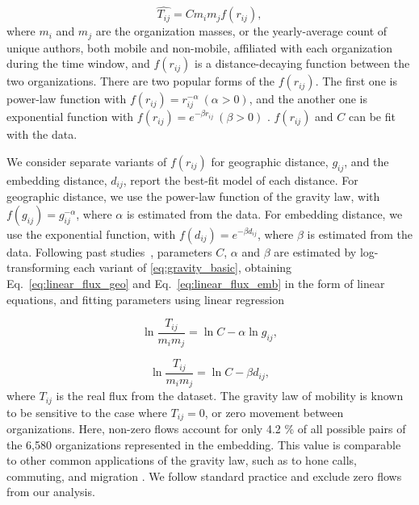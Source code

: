 \documentclass[12pt]{article} %
\begin{document}
%
%
\begin{equation}
	\label{eq:gravity_basic}
	\hat{T_{ij}} = Cm_{i}m_{j}f(r_{ij}),
\end{equation}
where $m_{i}$ and $m_{j}$ are the organization masses, or the yearly-average count of unique authors, both mobile and non-mobile, affiliated with each organization during the time window, and $f(r_{ij})$ is a distance-decaying function  between the two organizations. There are two popular forms of the $f(r_{ij})$. The first one is power-law function with $f(r_{ij})= r^{-\alpha}_{ij} \ (\alpha > 0)$, and the another one is exponential function with $f(r_{ij}) = e^{-\beta r_{ij}} \ (\beta > 0)$ \autocite{chen2015distance}.  
$f(r_{ij})$ and $C$ can be fit with the data.

We consider separate variants of $f(r_{ij})$ for geographic distance, $g_{ij}$, and the embedding distance, $d_{ij}$, report the best-fit model of each distance.
For geographic distance, we use the power-law function of the gravity law, with $f(g_{ij})= g^{-\alpha}_{ij}$, where $\alpha$ is estimated from the data.
For embedding distance, we use the exponential function, with $f(d_{ij}) = e^{-\beta d_{ij}}$, where $\beta$ is estimated from the data.
Following past studies~\autocite{simini2012universal}, parameters $C$, $\alpha$ and $\beta$ are estimated by log-transforming each variant of \ref{eq:gravity_basic}, obtaining Eq.~\ref{eq:linear_flux_geo} and Eq.~\ref{eq:linear_flux_emb} in the form of linear equations, and fitting parameters using linear regression \autocite{jung2008highwaygravity, curiel2018citygravity, lewer2008immigrationgravity, xia2005measlesgravity, truscott2012epidemicgravity, hong2016busgravity, simini2012universal}

\begin{equation}
	\label{eq:linear_flux_geo}
	\ln\frac{T_{ij}}{m_im_j} = \ln C  - \alpha \ln g_{ij},
\end{equation}

\begin{equation}
	\label{eq:linear_flux_emb}
	\ln\frac{T_{ij}}{m_im_j} = \ln C - \beta d_{ij},
\end{equation}
where $T_{ij}$ is the real flux from the dataset. The gravity law of mobility is known to be sensitive to the case where $T_{ij} = 0$, or zero movement between organizations.
Here, non-zero flows account for only 4.2 \% of all possible pairs of the 6,580 organizations represented in the embedding.
This value is comparable to other common applications of the gravity law, such as to hone calls, commuting, and migration \autocite{simini2012universal}.
We follow standard practice and exclude zero flows from our analysis.
\end{document}
